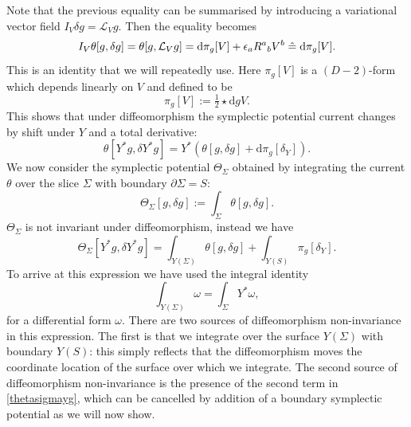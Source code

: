 \documentclass[a4paper,11pt]{article}
\def\rd{\mathrm{d}}
\def\pa{\partial}
\newcommand{\hateq}{\mathrel{\hat{=}}}
\begin{document}
Note that the previous equality can be summarised by introducing a variational vector field $I_V \delta g = \mathcal{L}_V g$.
Then the equality becomes
\begin{equation}\label{IT}
I_V \theta[g,\delta g] = \theta[g,{\cal L}_V g]= \rd \pi_g[V] + \epsilon_a R^a{}_b V^b \hateq \rd \pi_g[V].
\end{equation}
This is an identity that we will repeatedly use.
Here $\pi_g[V]$ is a $(D-2)$-form which depends linearly on $V$ and defined to be 
\begin{equation}
\pi_g[V] := \tfrac{1}{2} \star \rd g V.
\end{equation}
This shows that under diffeomorphism the symplectic potential current changes by shift under $Y$ and a total derivative:
\begin{equation} \label{grboundaryterm}
\theta[Y^{*} g, \delta Y^{*} g] = Y^* \left(\theta[g, \delta g] + \rd \pi_g[\delta_Y] \right).
\end{equation}
We now consider the symplectic potential $\Theta_\Sigma$ obtained by integrating the current $\theta$ over the slice $\Sigma$ with boundary $\pa\Sigma =S$:
\begin{equation}
\Theta_\Sigma[g, \delta g] := \int_\Sigma \theta[g, \delta g].
\end{equation}
$\Theta_\Sigma$ is not invariant under diffeomorphism, instead we have
\begin{equation} \label{thetasigmayg}
\Theta_\Sigma[Y^*g, \delta Y^*g] = \int_{Y(\Sigma)} \theta[g, \delta g] +  \int_{Y(S)} \pi_g[\delta_Y].
\end{equation}
To arrive at this expression we have used the integral identity
\begin{equation}
\int_{Y(\Sigma)} \omega = \int_{\Sigma} Y^* \omega,
\end{equation}
for a differential form $\omega$.
There are two sources of diffeomorphism non-invariance in this expression.
The first is that we integrate over the surface $Y(\Sigma)$ with boundary $Y(S)$: this simply reflects that the diffeomorphism moves the coordinate location of the surface over which we integrate.
The second source of diffeomorphism non-invariance is the presence of the second term in \eqref{thetasigmayg}, which can be cancelled by addition of a boundary symplectic potential as we will now show.
\end{document}

